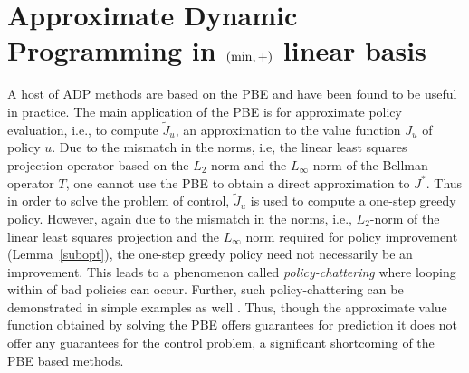 \chapter{Approximate Dynamic Programming in $(\min,+)$ linear basis}
A host of ADP methods are based on the PBE and have been found to be useful in practice. The main application of the PBE is for approximate policy evaluation, i.e., to compute $\tilde{J}_u$, an approximation to the value function $J_u$ of policy $u$. Due to the mismatch in the norms, i.e, the linear least squares projection operator based on the $L_2$-norm and the $L_\infty$-norm of the Bellman operator $T$, one cannot use the PBE to obtain a direct approximation to $J^*$. Thus in order to solve the problem of control, $\tilde{J}_u$ is used to compute a one-step greedy policy. However, again due to the mismatch in the norms, i.e., $L_2$-norm of the linear least squares projection and the $L_\infty$ norm required for policy improvement (Lemma~\ref{subopt}), the one-step greedy policy need not necessarily be an improvement. This leads to a phenomenon called \emph{policy-chattering} \cite{dpchapter} where looping within of bad policies can occur. Further, such policy-chattering can be demonstrated in simple examples as well \cite{dpchapter}. Thus, though the approximate value function obtained by solving the PBE offers guarantees for prediction it does not offer any guarantees for the control problem, a significant shortcoming of the PBE based methods.\\
